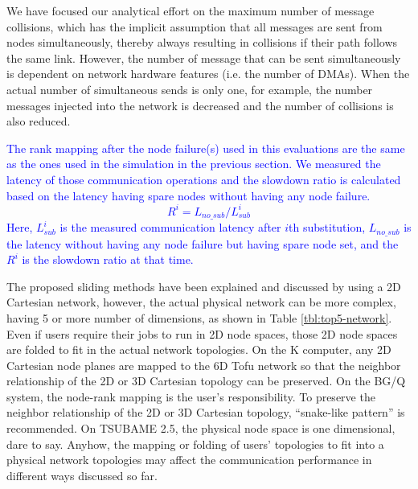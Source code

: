 \documentclass[Afour,times,sagev]{sagej}
\newcommand{\AH}[1]{%
  \textcolor{blue}{#1}}%
\begin{document}
We have focused our analytical effort on the
maximum number of message collisions, which has the implicit
assumption that all messages are sent from nodes simultaneously,
thereby always resulting in collisions if their path follows the same
link. However, the number of message that can be sent simultaneously
is dependent on network hardware features (i.e. the number of
DMAs). When the actual number of simultaneous sends is only one, for
example, the number messages injected into the network is decreased
and the number of collisions is also reduced.

\AH{The rank mapping after the node
failure(s) used in this evaluations are the same as the ones used in
the simulation in the previous section. 
We measured the latency of those communication operations and the
slowdown ratio is calculated based on the latency having spare
nodes without having any node failure. 
}
\AH{
\[
R^i = L_{no\_sub} / L_{sub}^i
\]
}
\AH{
Here, $L_{sub}^i$ is the measured communication latency after
$i$th substitution, $L_{no\_sub}$ is the latency without having any 
node failure but having spare node set, and the $R^i$ is the
slowdown ratio at that time. 
}

The proposed sliding methods have been explained and discussed by
using a 2D Cartesian network, however, the actual physical network can
be more complex, having 5 or more number of dimensions, as shown in
Table \ref{tbl:top5-network}. Even if users
require their jobs to run in 2D node spaces, those 2D node spaces
are folded to fit in the actual network topologies. On the K computer,
any 2D Cartesian node planes are mapped to the 6D Tofu network so that
the neighbor relationship of the 2D or 3D Cartesian topology can be
preserved. On the BG/Q system, the node-rank mapping is the user's
responsibility. To preserve the neighbor relationship of the 2D or 3D
Cartesian topology, ``snake-like pattern'' is
recommended\citep{BGQ-softdev}. On TSUBAME 2.5, the physical node
space is one dimensional, dare to say. Anyhow, the
mapping or folding of users' topologies to fit into a physical network
topologies may affect the communication performance in different ways
discussed so far.
\end{document}
